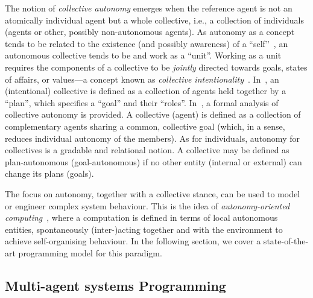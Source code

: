 The notion of \emph{collective autonomy}
 emerges when the reference agent 
 is not an atomically individual agent
 but a whole collective, i.e., a collection of individuals (agents or other, possibly non-autonomous agents).
%
As autonomy as a concept tends to be related to the existence (and possibly awareness) of a ``self''~\cite{sekiyama1996dissipative-structure-network-for-collective-autonomy}, 
 an autonomous collective tends to be and work as a ``unit''.
%
Working as a unit requires the components of a collective
 to be \emph{jointly} directed towards goals, states of affairs, or values---a concept known as \emph{collective intentionality}~\cite{DBLP:journals/cogsr/BottazziCGL06,ray2009collective-intentionality-fleets}. 
%
In~\cite{DBLP:journals/cogsr/BottazziCGL06},
 an (intentional) collective
 is defined as a collection of agents held together by a ``plan'', which specifies a ``goal'' and their ``roles''.
%
In~\cite{conte2006collective-autonomy}, a formal analysis of collective autonomy is provided. A collective (agent) is defined as a collection of complementary agents sharing a common, collective goal (which, in a sense, reduces individual autonomy of the members).
%
As for individuals, autonomy for collectives is a gradable and relational notion.
%
A collective may be defined as plan-autonomous (goal-autonomous) if no other entity (internal or external) can change its plans (goals).
%

The focus on autonomy, together with a collective stance,
 can be used to model or engineer complex system behaviour.
%
This is the idea of \emph{autonomy-oriented computing}~\cite{liu2005autonomy-oriented-computing},
 where a computation is defined in terms
 of local autonomous entities, spontaneously (inter-)acting together and with the environment to achieve self-organising behaviour.
%
In the following section, we cover a state-of-the-art programming model for this paradigm.

\subsection{Multi-agent systems Programming}


